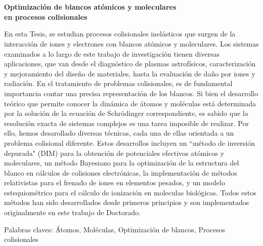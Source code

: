 \chapter*{}%
%

\begin{center}
\begin{large}
\textbf{Optimización de blancos atómicos y moleculares \\ en procesos colisionales}
\end{large}
\end{center}

\vspace{1cm}
En esta Tesis, se estudian procesos colisionales inelásticos que surgen 
de la interacción de iones y electrones con blancos atómicos y 
moleculares. Los sistemas examinados a lo largo de este trabajo de 
investigación tienen diversas aplicaciones, que van desde el diagnóstico 
de plasmas astrofísicos, caracterización y mejoramiento del diseño de 
materiales, hasta la evaluación de daño por iones y radiación. 
En el tratamiento de problemas colisionales, es de fundamental importancia 
contar una precisa representación de los blancos. Si bien el desarrollo 
teórico que permite conocer la dinámica de átomos y moléculas está 
determinada por la solución de la ecuación de Schr\"odinger 
correspondiente, es sabido que la resolución exacta de sistemas 
complejos es una tarea imposible de realizar. Por ello, hemos 
desarollado diversas técnicas, cada una de ellas orientada a un problema
colisional diferente. Estos desarrollos incluyen un ``método de inversión 
depurada" (DIM) para la obtención de potenciales efectivos atómicos y 
moleculares, un método Bayesiano para la optimización de la estructura 
del blanco en cálculos de colisiones electrónicas, la implementación 
de métodos relativistas para el frenado de iones en elementos pesados, 
y un modelo estequiométrico para el cálculo de ionización en moleculas 
biológicas.
Todos estos métodos han sido desarrollados desde primeros principios y
son implementados originalmente en este trabajo de Doctorado.


\vspace{1cm}
\noindent
Palabras claves:  
Átomos,
Moléculas,
Optimización de blancos,
Procesos colisionales
